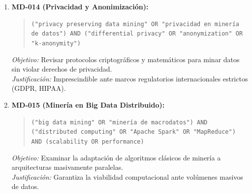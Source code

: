 \begin{enumerate}
  \begin{quote}
  \texttt{("financial data mining" OR "minería de datos financieros") AND ("fraud detection" OR "detección de fraude" OR "credit risk") AND ("machine learning")}
  \end{quote}
  \textit{Objetivo:} Evaluar modelos para identificar transacciones anómalas, riesgo crediticio y blanqueo de capitales.\\
  \textit{Justificación:} El fraude financiero impone altos costos y requiere análisis en milisegundos.
  \item \textbf{MD-014 (Privacidad y Anonimización):}
  \begin{quote}
  \texttt{("privacy preserving data mining" OR "privacidad en minería de datos") AND ("differential privacy" OR "anonymization" OR "k-anonymity")}
  \end{quote}
  \textit{Objetivo:} Revisar protocolos criptográficos y matemáticos para minar datos sin violar derechos de privacidad.\\
  \textit{Justificación:} Imprescindible ante marcos regulatorios internacionales estrictos (GDPR, HIPAA).
  \item \textbf{MD-015 (Minería en Big Data Distribuido):}
  \begin{quote}
  \texttt{("big data mining" OR "minería de macrodatos") AND ("distributed computing" OR "Apache Spark" OR "MapReduce") AND (scalability OR performance)}
  \end{quote}
  \textit{Objetivo:} Examinar la adaptación de algoritmos clásicos de minería a arquitecturas masivamente paralelas.\\
  \textit{Justificación:} Garantiza la viabilidad computacional ante volúmenes masivos de datos.
\end{enumerate}


